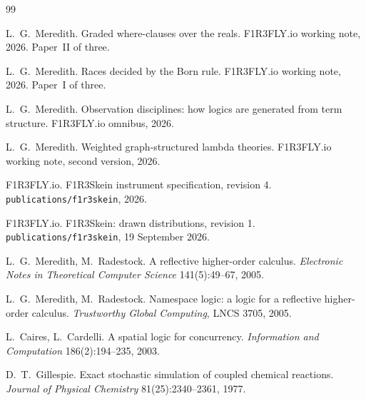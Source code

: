 \documentclass[11pt,a4paper]{article}
\theoremstyle{plain}
\theoremstyle{definition}
\theoremstyle{remark}
\begin{document}
\begin{thebibliography}{99}

L.~G.~Meredith. Graded where-clauses over the reals. F1R3FLY.io working note,
2026. Paper~II of three.

L.~G.~Meredith. Races decided by the Born rule. F1R3FLY.io working note, 2026.
Paper~I of three.

L.~G.~Meredith. Observation disciplines: how logics are generated from term
structure. F1R3FLY.io omnibus, 2026.

L.~G.~Meredith. Weighted graph-structured lambda theories. F1R3FLY.io working
note, second version, 2026.

F1R3FLY.io. F1R3Skein instrument specification, revision 4.
\texttt{publications/f1r3skein}, 2026.

F1R3FLY.io. F1R3Skein: drawn distributions, revision 1.
\texttt{publications/f1r3skein}, 19 September 2026.

L.~G.~Meredith, M.~Radestock. A reflective higher-order calculus.
\emph{Electronic Notes in Theoretical Computer Science} 141(5):49--67, 2005.

L.~G.~Meredith, M.~Radestock. Namespace logic: a logic for a reflective
higher-order calculus. \emph{Trustworthy Global Computing}, LNCS 3705, 2005.

L.~Caires, L.~Cardelli. A spatial logic for concurrency.
\emph{Information and Computation} 186(2):194--235, 2003.

D.~T.~Gillespie. Exact stochastic simulation of coupled chemical reactions.
\emph{Journal of Physical Chemistry} 81(25):2340--2361, 1977.

\end{thebibliography}
\end{document}
